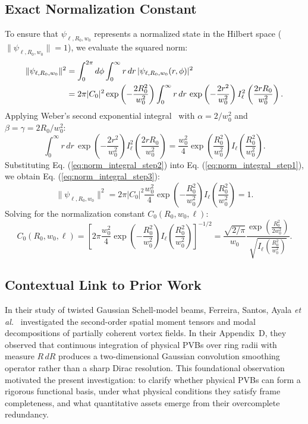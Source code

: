 \documentclass[11pt,a4paper]{article}
\begin{document}
\subsection{Exact Normalization Constant}

To ensure that $\psi_{\ell, R_0, w_0}$ represents a normalized state in the Hilbert space ($\|\psi_{\ell, R_0, w_0}\| = 1$), we evaluate the squared norm:
\begin{align}
\|\psi_{\ell, R_0, w_0}\|^2 &= \int_0^{2\pi} d\phi \int_0^\infty r \, dr \, |\psi_{\ell, R_0, w_0}(r, \phi)|^2 \notag \\
&= 2\pi |C_0|^2 \exp\left( - \frac{2 R_0^2}{w_0^2} \right) \int_0^\infty r \, dr \, \exp\left( - \frac{2 r^2}{w_0^2} \right) I_\ell^2\left( \frac{2 r R_0}{w_0^2} \right).
\label{eq:norm_integral_step1}
\end{align}
Applying Weber's second exponential integral~\cite{Gradshteyn2014} with $\alpha = 2 / w_0^2$ and $\beta = \gamma = 2 R_0 / w_0^2$:
\begin{equation}
\int_0^\infty r \, dr \, \exp\left( - \frac{2 r^2}{w_0^2} \right) I_\ell^2\left( \frac{2 r R_0}{w_0^2} \right) = \frac{w_0^2}{4} \exp\left( \frac{R_0^2}{w_0^2} \right) I_\ell\left( \frac{R_0^2}{w_0^2} \right).
\label{eq:norm_integral_step2}
\end{equation}
Substituting Eq. (\ref{eq:norm_integral_step2}) into Eq. (\ref{eq:norm_integral_step1}), we obtain Eq. (\ref{eq:norm_integral_step3}):
\begin{equation}
\|\psi_{\ell, R_0, w_0}\|^2 = 2\pi |C_0|^2 \frac{w_0^2}{4} \exp\left( - \frac{R_0^2}{w_0^2} \right) I_\ell\left( \frac{R_0^2}{w_0^2} \right) = 1.
\label{eq:norm_integral_step3}
\end{equation}
Solving for the normalization constant $C_0(R_0, w_0, \ell)$:
\begin{equation}
\boxed{C_0(R_0, w_0, \ell) = \left[ 2\pi \frac{w_0^2}{4} \exp\left( - \frac{R_0^2}{w_0^2} \right) I_\ell\left( \frac{R_0^2}{w_0^2} \right) \right]^{-1/2} = \frac{\sqrt{2/\pi}}{w_0} \frac{\exp\left( \frac{R_0^2}{2 w_0^2} \right)}{\sqrt{I_\ell\left( \frac{R_0^2}{w_0^2} \right)}}.}
\label{eq:exact_normalization_constant}
\end{equation}

\subsection{Contextual Link to Prior Work}

In their study of twisted Gaussian Schell-model beams, Ferreira, Santos, Ayala \emph{et al.}~\cite{Ferreira2026} investigated the second-order spatial moment tensors and modal decompositions of partially coherent vortex fields. In their Appendix~D, they observed that continuous integration of physical PVBs over ring radii with measure $R \, dR$ produces a two-dimensional Gaussian convolution smoothing operator rather than a sharp Dirac resolution. This foundational observation motivated the present investigation: to clarify whether physical PVBs can form a rigorous functional basis, under what physical conditions they satisfy frame completeness, and what quantitative assets emerge from their overcomplete redundancy.
\end{document}
